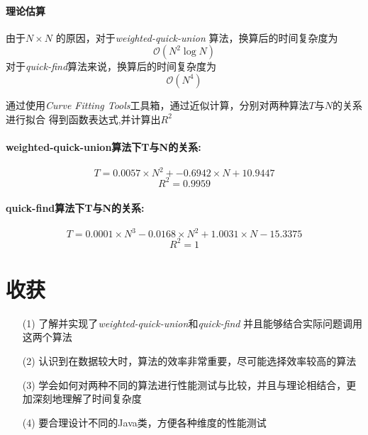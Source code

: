 \documentclass[12pt,a4paper]{ctexart}
\begin{document}
\paragraph{理论估算} 由于$N \times N$ 的原因，对于\textit{weighted-quick-union}
算法，换算后的时间复杂度为
\begin{equation}
    \nonumber
    \mathcal{O}(N^2 \log{N})
\end{equation}
对于\textit{quick-find}算法来说，换算后的时间复杂度为
\begin{equation}
    \nonumber
    \mathcal{O}(N^4)
\end{equation}


通过使用\textit{Curve Fitting Tools}工具箱，通过近似计算，分别对两种算法$T$与$N$的关系进行拟合
得到函数表达式,并计算出$R^2$
\paragraph{weighted-quick-union算法下T与N的关系:}
$$ T = 0.0057 \times N^2 + -0.6942 \times N + 10.9447$$
$$ R^2 = 0.9959 $$
\paragraph{quick-find算法下T与N的关系:}
$$ T = 0.0001 \times N^3 -0.0168 \times N^2 +1.0031 \times N -15.3375$$
$$ R^2 = 1$$



\section{收获}
\begin{enumerate}
    \item[(1)] 了解并实现了\textit{weighted-quick-union}和\textit{quick-find}
    并且能够结合实际问题调用这两个算法
    \item[(2)] 认识到在数据较大时，算法的效率非常重要，尽可能选择效率较高的算法
    \item[(3)] 学会如何对两种不同的算法进行性能测试与比较，并且与理论相结合，更加深刻地理解了时间复杂度
    \item[(4)] 要合理设计不同的Java类，方便各种维度的性能测试 
\end{enumerate}
\end{document}
